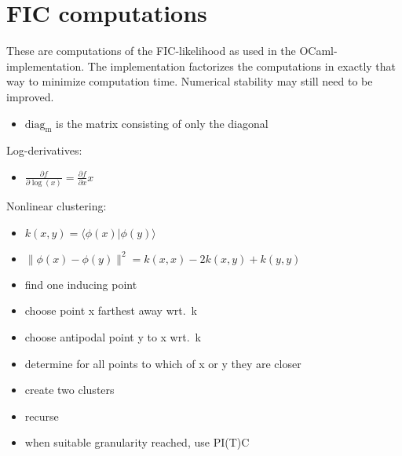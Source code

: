 \documentclass[12pt]{article}
\begin{document}
\section{FIC computations}

These are computations of the FIC-likelihood as used in the
OCaml-implementation.  The implementation factorizes the computations
in exactly that way to minimize computation time.  Numerical stability
may still need to be improved.

\begin{itemize}
\item $\mathrm{diag_m}$ is the matrix consisting of only the diagonal
\end{itemize}

Log-derivatives:

\begin{itemize}
\item $\tfrac{\partial f}{\partial \log(x)} = \tfrac{\partial f}{\partial x} x$
\end{itemize}

Nonlinear clustering:

\begin{itemize}
\item $k(x, y) = \langle \phi(x) | \phi(y) \rangle$
\item $\|\phi(x) - \phi(y)\|^2 = k(x,x)-2k(x,y)+k(y,y)$
\item find one inducing point
\item choose point x farthest away wrt.\ k
\item choose antipodal point y to x wrt.\ k
\item determine for all points to which of x or y they are closer
\item create two clusters
\item recurse
\item when suitable granularity reached, use PI(T)C
\end{itemize}
\end{document}
